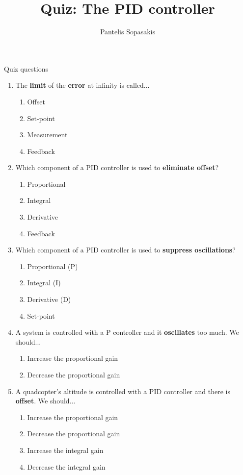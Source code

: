 \documentclass[a4paper,10pt,reqno]{amsart}
\title[PID Controller]{Quiz: The PID controller}
\author[P. Sopasakis]{Pantelis Sopasakis}
\numberwithin{equation}{section}
\theoremstyle{plain}
\begin{document}
\maketitle
Quiz questions
\begin{enumerate} 
 \item The \textbf{limit} of the \textbf{error} at infinity is called...
    \begin{enumerate}
     \item Offset
     \item Set-point
     \item Measurement
     \item Feedback
    \end{enumerate}
    
 \item Which component of a PID controller is used to \textbf{eliminate offset}?
  \begin{enumerate}
   \item Proportional
   \item Integral
   \item Derivative
   \item Feedback
  \end{enumerate}

 \item Which component of a PID controller is used to \textbf{suppress oscillations}?
  \begin{enumerate}
   \item Proportional (P)
   \item Integral (I)
   \item Derivative (D)
   \item Set-point
  \end{enumerate}

  \item A system is controlled with a P controller and it \textbf{oscillates} too much. 
        We should...
  \begin{enumerate}
   \item Increase the proportional gain
   \item Decrease the proportional gain
  \end{enumerate}
  
  
  \item A quadcopter's altitude is controlled with a PID controller and there
        is \textbf{offset}. We should...        
  \begin{enumerate}
   \item Increase the proportional gain
   \item Decrease the proportional gain
   \item Increase the integral gain
   \item Decrease the integral gain
  \end{enumerate}
        

\end{enumerate}
\end{document}
